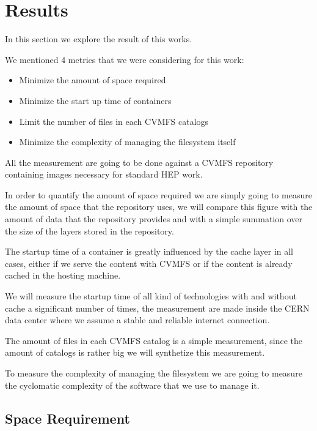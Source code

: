 \chapter{Results}\label{ch:Results}

In this section we explore the result of this works.

We mentioned 4 metrics that we were considering for this work:

\begin{itemize}
\item Minimize the amount of space required
\item Minimize the start up time of containers
\item Limit the number of files in each CVMFS catalogs
\item Minimize the complexity of managing the filesystem itself
\end{itemize}

All the measurement are going to be done against a CVMFS repository containing
images necessary for standard HEP work.

In order to quantify the amount of space required we are simply going to
measure the amount of space that the repository uses, we will compare this
figure with the amount of data that the repository provides and with a simple
summation over the size of the layers stored in the repository.

The startup time of a container is greatly influenced by the cache layer in all
cases, either if we serve the content with CVMFS or if the content is already
cached in the hosting machine.

We will measure the startup time of all kind of technologies with and without
cache a significant number of times, the measurement are made inside the CERN
data center where we assume a stable and reliable internet connection.

The amount of files in each CVMFS catalog is a simple measurement, since the
amount of catalogs is rather big we will synthetize this measurement.

To measure the complexity of managing the filesystem we are going to measure
the cyclomatic complexity of the software that we use to manage it.

\section{Space Requirement}

